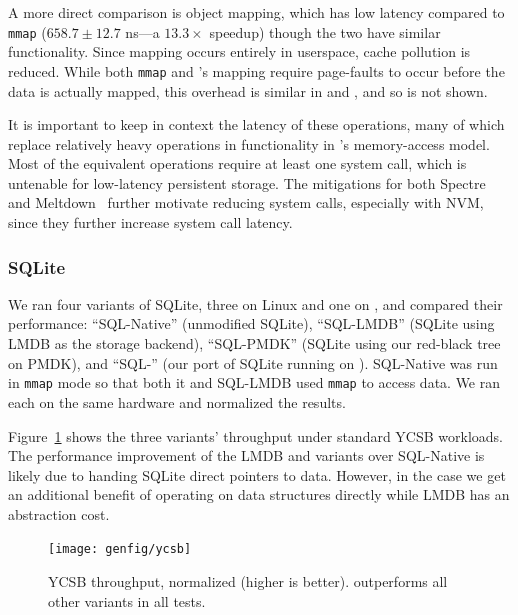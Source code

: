 A more direct comparison is object mapping, which has
low latency compared to \texttt{mmap} ($658.7 \pm 12.7$ ns---a $13.3\times$ speedup) though the two have similar
functionality. Since mapping occurs entirely
in userspace, cache pollution is reduced.
While both \texttt{mmap} and \Twizzler's mapping require
page-faults to occur before the data is actually mapped,
this overhead is similar in \Twizzler and \unix, and so is not
shown.


It is important to keep in context the latency of these operations, many of which
replace relatively heavy \unix operations in functionality in \Twizzler's memory-access
model. Most of the equivalent \unix operations require
at least one system call, which is untenable for low-latency persistent
storage.
The mitigations for both Spectre~\cite{spectre} and
Meltdown~\cite{meltdown} further motivate reducing system calls, especially with
NVM, since they further increase system call latency.


\subsubsection{SQLite}

We ran four variants of SQLite, three on Linux and one on \Twizzler, and compared their performance: ``SQL-Native'' (unmodified SQLite),
``SQL-LMDB'' (SQLite using LMDB as the storage backend), ``SQL-PMDK'' (SQLite using
our red-black tree on PMDK),
and ``SQL-\Twizzler'' (our port of SQLite running on \Twizzler). SQL-Native was run in \texttt{mmap} mode so that both it
and SQL-LMDB used \texttt{mmap} to access data.
We ran each on the same hardware and normalized the results.


Figure~\ref{fig:ycsb} shows the three variants' throughput under standard YCSB
workloads. The performance improvement of the LMDB and \Twizzler variants over SQL-Native is
likely due to handing SQLite direct pointers to data. However, in the \Twizzler
case we get an additional benefit of operating on data structures directly while LMDB has an
abstraction cost.

\begin{figure}
    \centering
    \texttt{[image: genfig/ycsb]}
    \caption[YCSB throughput]{YCSB throughput, normalized (higher is better). \Twizzler outperforms all other
        variants in all tests.}
    \label{fig:ycsb}
\end{figure}

